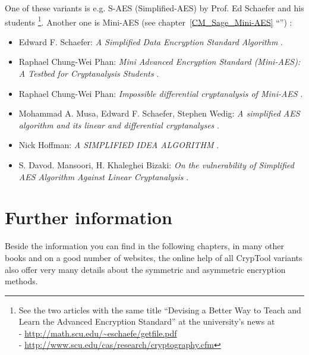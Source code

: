 One of these variants is e.g. S-AES (Simplified-AES) by Prof. Ed Schaefer
and his students \cite{cm:Musa-etal2003}%
\footnote{
    See the two articles with the same title
    ``Devising a Better Way to Teach and Learn the Advanced Encryption Standard''
    at the university's news at\\
    - \url{http://math.scu.edu/~eschaefe/getfile.pdf} \\
    - \url{http://www.scu.edu/cas/research/cryptography.cfm}
}.
Another one is Mini-AES \cite{cm:Phan2002}
(see chapter~\ref{CM_Sage_Mini-AES} ``'')%
:
\begin{itemize}

\item Edward F. Schaefer: {\em A Simplified Data Encryption Standard Algorithm} 
      \cite{cm:Schaefer1996}.

\item Raphael Chung-Wei Phan: {\em Mini Advanced Encryption Standard (Mini-AES):
                                   A Testbed for Cryptanalysis Students} 
      \cite{cm:Phan2002}.

\item Raphael Chung-Wei Phan: {\em Impossible differential cryptanalysis of Mini-AES} 
      \cite{cm:Phan2003}.

\item Mohammad A. Musa, Edward F. Schaefer, Stephen Wedig:
      {\em A simplified AES algorithm and its linear and differential cryptanalyses} 
      \cite{cm:Musa-etal2003}.

\item Nick Hoffman: {\em A SIMPLIFIED IDEA ALGORITHM} 
      \cite{cm:Hoffman2006}.

\item S. Davod. Mansoori, H. Khaleghei Bizaki: 
      {\em On the vulnerability of Simplified AES Algorithm Against Linear Cryptanalysis} 
      \cite{cm:Mansoori-etal2007}.

\end{itemize}




\section{Further information}

Beside the information you can find in the following chapters, in many other
books and on a good number of websites, the online help of all
CrypTool variants also offer very many details about the 
symmetric and asymmetric encryption methods.


